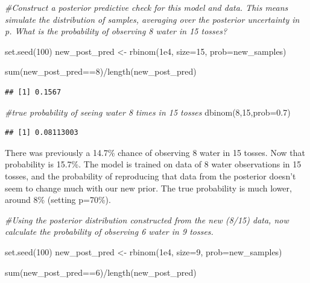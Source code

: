 \documentclass[
]{book}
\newenvironment{Shaded}{\begin{snugshade}}{\end{snugshade}}
\newcommand{\AttributeTok}[1]{\textcolor[rgb]{0.77,0.63,0.00}{#1}}
\newcommand{\CommentTok}[1]{\textcolor[rgb]{0.56,0.35,0.01}{\textit{#1}}}
\newcommand{\DecValTok}[1]{\textcolor[rgb]{0.00,0.00,0.81}{#1}}
\newcommand{\FloatTok}[1]{\textcolor[rgb]{0.00,0.00,0.81}{#1}}
\newcommand{\FunctionTok}[1]{\textcolor[rgb]{0.00,0.00,0.00}{#1}}
\newcommand{\NormalTok}[1]{#1}
\newcommand{\OtherTok}[1]{\textcolor[rgb]{0.56,0.35,0.01}{#1}}
\newcommand{\SpecialCharTok}[1]{\textcolor[rgb]{0.00,0.00,0.00}{#1}}
\begin{document}
\begin{Shaded}
\begin{Highlighting}[]
\CommentTok{\#Construct a posterior predictive check for this model and data. This means simulate the distribution of samples, averaging over the posterior uncertainty in p. What is the probability of observing 8 water in 15 tosses?}

\FunctionTok{set.seed}\NormalTok{(}\DecValTok{100}\NormalTok{)}
\NormalTok{new\_post\_pred }\OtherTok{\textless{}{-}} \FunctionTok{rbinom}\NormalTok{(}\FloatTok{1e4}\NormalTok{, }\AttributeTok{size=}\DecValTok{15}\NormalTok{, }\AttributeTok{prob=}\NormalTok{new\_samples)}

\FunctionTok{sum}\NormalTok{(new\_post\_pred}\SpecialCharTok{==}\DecValTok{8}\NormalTok{)}\SpecialCharTok{/}\FunctionTok{length}\NormalTok{(new\_post\_pred)}
\end{Highlighting}
\end{Shaded}

\begin{verbatim}
## [1] 0.1567
\end{verbatim}

\begin{Shaded}
\begin{Highlighting}[]
\CommentTok{\#true probability of seeing water 8 times in 15 tosses}
\FunctionTok{dbinom}\NormalTok{(}\DecValTok{8}\NormalTok{,}\DecValTok{15}\NormalTok{,}\AttributeTok{prob=}\FloatTok{0.7}\NormalTok{)}
\end{Highlighting}
\end{Shaded}

\begin{verbatim}
## [1] 0.08113003
\end{verbatim}

There was previously a 14.7\% chance of observing 8 water in 15 tosses. Now that probability is 15.7\%. The model is trained on data of 8 water observations in 15 tosses, and the probability of reproducing that data from the posterior doesn't seem to change much with our new prior. The true probability is much lower, around 8\% (setting p=70\%).

\begin{Shaded}
\begin{Highlighting}[]
\CommentTok{\#Using the posterior distribution constructed from the new (8/15) data, now calculate the probability of observing 6 water in 9 tosses.}

\FunctionTok{set.seed}\NormalTok{(}\DecValTok{100}\NormalTok{)}
\NormalTok{new\_post\_pred }\OtherTok{\textless{}{-}} \FunctionTok{rbinom}\NormalTok{(}\FloatTok{1e4}\NormalTok{, }\AttributeTok{size=}\DecValTok{9}\NormalTok{, }\AttributeTok{prob=}\NormalTok{new\_samples)}

\FunctionTok{sum}\NormalTok{(new\_post\_pred}\SpecialCharTok{==}\DecValTok{6}\NormalTok{)}\SpecialCharTok{/}\FunctionTok{length}\NormalTok{(new\_post\_pred)}
\end{Highlighting}
\end{Shaded}
\end{document}
